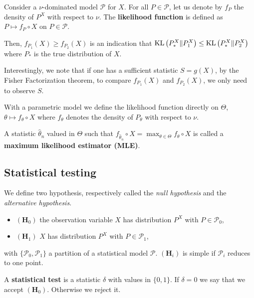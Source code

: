 	\begin{defn}
		Consider a $\nu$-dominated model $\mathcal{P}$ for $X$.
		For all $P \in \mathcal{P}$, let us denote by $f_P$ the density of $P^X$ with respect to $\nu$.
		The \textbf{likelihood function} is defined as $P \mapsto f_P \circ X$ on $P \in \mathcal{P}$.
	\end{defn}
	
	Then, $f_{P_1}(X) \geq f_{P_2}(X)$ is an indication that $\operatorname{KL} \left( P_*^X \| P_1^X \right) \leq \operatorname{KL} \left( P_*^X \| P_2^X \right)$ where $P_*$ is the true distribution of $X$.

	\begin{rem}
		Interestingly, we note that if one has a sufficient statistic $S = g(X)$, by the Fisher Factorization theorem, to compare $f_{P_1}(X)$ and $f_{P_2}(X)$, we only need to observe $S$.
	\end{rem}

	With a parametric model we define the likelihood function directly on $\Theta$, $\theta \mapsto f_\theta \circ X$ where $f_\theta$ denotes the density of $P_\theta$ with respect to $\nu$.
	
	\begin{defn}
		A statistic $\hat{\theta}_n$ valued in $\Theta$ such that $f_{\hat{\theta}_n} \circ X = \max_{\theta \in \Theta} f_\theta \circ X$ is called a \textbf{maximum likelihood estimator (MLE)}.
	\end{defn}

\subsection{Statistical testing}

	We define two hypothesis, respectively called the \emph{null hypothesis} and the \emph{alternative hypothesis}.
	\begin{itemize}
		\item[\textbullet] $(\mathbf{H}_0)$ the observation variable $X$ has distribution $P^X$ with $P \in \mathcal{P}_0$,
		\item[\textbullet] $(\mathbf{H}_1)$ $X$ has distribution $P^X$ with $P \in \mathcal{P}_1$,
	\end{itemize}
	with $\{ \mathcal{P}_0, \mathcal{P}_1 \}$ a partition of a statistical model $\mathcal{P}$.
	$(\mathbf{H}_i)$ is simple if $\mathcal{P}_i$ reduces to one point.
	
	\begin{defn}
		A \textbf{statistical test} is a statistic $\delta$ with values in $\{ 0, 1 \}$.
		If $\delta = 0$ we say that we accept $(\mathbf{H}_0)$.
		Otherwise we reject it.
	\end{defn}
	
